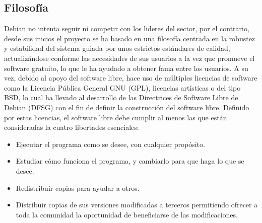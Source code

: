 \subsection{Filosofía}
Debian no intenta seguir ni competir con los lideres del sector, por el contrario, desde sus inicios el proyecto se ha basado en una filosofía centrada en la robustez y estabilidad del sistema guiada por unos estrictos estándares de calidad, actualizándose conforme las necesidades de sus usuarios a la vez que promueve el software gratuito, lo que le ha ayudado a obtener fama entre los usuarios. \cite{DebFil} \cite{pollei2013debian}
\newline
\newline
A su vez, debido al apoyo del software libre, hace uso de múltiples licencias de software como la Licencia Pública General GNU (GPL), licencias artísticas o del tipo BSD, lo cual ha llevado al desarrollo de las Directrices de Software Libre de Debian (DFSG) con el fin de definir la construcción del software libre. \cite{DebFree}
\newpage
Definido por estas licencias, el software libre debe cumplir al menos las que están consideradas la cuatro libertades esenciales: \cite{GnuFS}
\begin{itemize}
	\item Ejecutar el programa como se desee, con cualquier propósito.
	\item Estudiar cómo funciona el programa, y cambiarlo para que haga lo que se desee.
	\item Redistribuir copias para ayudar a otros.
	\item Distribuir copias de sus versiones modificadas a terceros permitiendo ofrecer a toda la comunidad la oportunidad de beneficiarse de las modificaciones.
\end{itemize}

